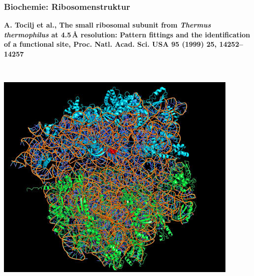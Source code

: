 \documentclass[10pt,t]{beamer}
\begin{document}
\begin{frame}
\frametitle{Biochemie: Ribosomenstruktur}
\vspace*{-2.6\baselineskip}
\alert{\bfseries\footnotesize A. Tocilj et al., The small ribosomal subunit from \textit{Thermus thermophilus} at 4.5\,\AA{} resolution: Pattern fittings and the identification of a functional site, Proc. Natl. Acad. Sci. USA 95 (1999) 25, 14252--14257}
\vspace*{\baselineskip}
\begin{columns}
~\\[-\baselineskip]
    \includegraphics[width=\textwidth]{ribosom-struktur}
    \vspace*{-1ex}


\end{columns}
\end{frame}
\end{document}

